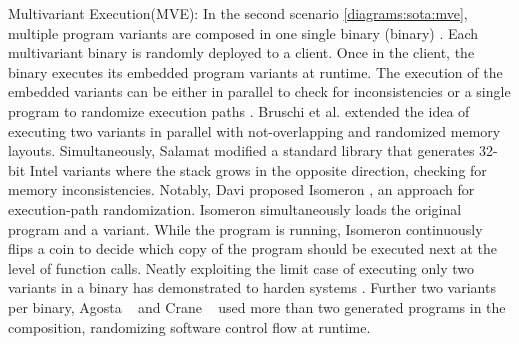 \begin{usage}{Multivariant Execution(MVE):}
    \label{usage:mve}
    \normalfont
    In the second scenario \autoref{diagrams:sota:mve}, multiple program variants are composed in one single binary (binary) \cite{cox06}. Each multivariant binary is randomly deployed to a client. Once in the client, the binary executes its embedded program variants at runtime. 
    The execution of the embedded variants can be either in parallel to check for inconsistencies or a single program to randomize execution paths \cite{bhatkar03}. Bruschi et al. \cite{bruschi2007diversified} extended the idea of executing two variants in parallel with not-overlapping and randomized memory layouts. Simultaneously, Salamat \etal \cite{salamat2007stopping} modified a standard library that generates 32-bit Intel variants where the stack grows in the opposite direction, checking for memory inconsistencies. Notably, Davi \etal proposed Isomeron \cite{davi2015isomeron}, an approach  for execution-path randomization. Isomeron simultaneously loads the original program and a variant. While the program is running, Isomeron continuously flips a coin to decide which copy of the program should be executed next at the level of function calls. 
    Neatly exploiting the limit case of executing only two variants in a binary has demonstrated to harden systems \cite{salamat2009orchestra, maurer2012tachyon,Kim2015, lu2018stopping, davi2015isomeron}.  Further two variants per binary,
    Agosta \etal~\cite{agosta2015meet} and Crane \etal~\cite{crane2015thwarting} used more than two generated programs in the composition, randomizing software control flow at runtime.  
    

    
\end{usage}


